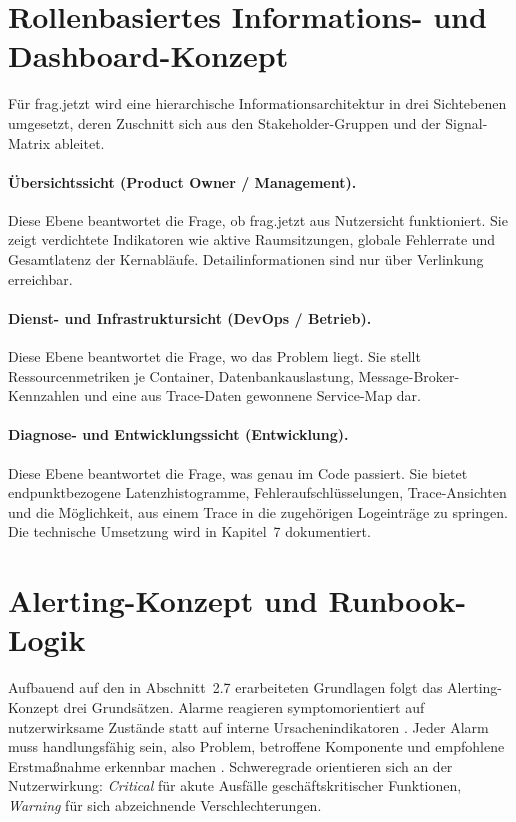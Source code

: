  
\section{Rollenbasiertes Informations- und Dashboard-Konzept}
\label{sec:dashboard-konzept}
 
Für frag.jetzt wird eine hierarchische Informationsarchitektur in drei Sichtebenen umgesetzt, deren Zuschnitt sich aus den Stakeholder-Gruppen und der Signal-Matrix ableitet.
 
\paragraph{Übersichtssicht (Product Owner / Management).}
Diese Ebene beantwortet die Frage, ob frag.jetzt aus Nutzersicht funktioniert. Sie zeigt verdichtete Indikatoren wie aktive Raumsitzungen, globale Fehlerrate und Gesamtlatenz der Kernabläufe. Detailinformationen sind nur über Verlinkung erreichbar.
 
\paragraph{Dienst- und Infrastruktursicht (DevOps / Betrieb).}
Diese Ebene beantwortet die Frage, wo das Problem liegt. Sie stellt Ressourcenmetriken je Container, Datenbankauslastung, Message-Broker-Kennzahlen und eine aus Trace-Daten gewonnene Service-Map dar.
 
\paragraph{Diagnose- und Entwicklungssicht (Entwicklung).}
Diese Ebene beantwortet die Frage, was genau im Code passiert. Sie bietet endpunktbezogene Latenzhistogramme, Fehleraufschlüsselungen, Trace-Ansichten und die Möglichkeit, aus einem Trace in die zugehörigen Logeinträge zu springen. Die technische Umsetzung wird in Kapitel~7 dokumentiert.
 
 
\section{Alerting-Konzept und Runbook-Logik}
\label{sec:alerting-konzept}
 
Aufbauend auf den in Abschnitt~2.7 erarbeiteten Grundlagen folgt das Alerting-Konzept drei Grundsätzen. Alarme reagieren symptomorientiert auf nutzerwirksame Zustände statt auf interne Ursachenindikatoren \parencite[S.~63--64]{ewaschukMonitoringDistributedSystems}. Jeder Alarm muss handlungsfähig sein, also Problem, betroffene Komponente und empfohlene Erstmaßnahme erkennbar machen \parencite[S.~174]{vinnakota2025creating}. Schweregrade orientieren sich an der Nutzerwirkung: \emph{Critical} für akute Ausfälle geschäftskritischer Funktionen, \emph{Warning} für sich abzeichnende Verschlechterungen.
 
